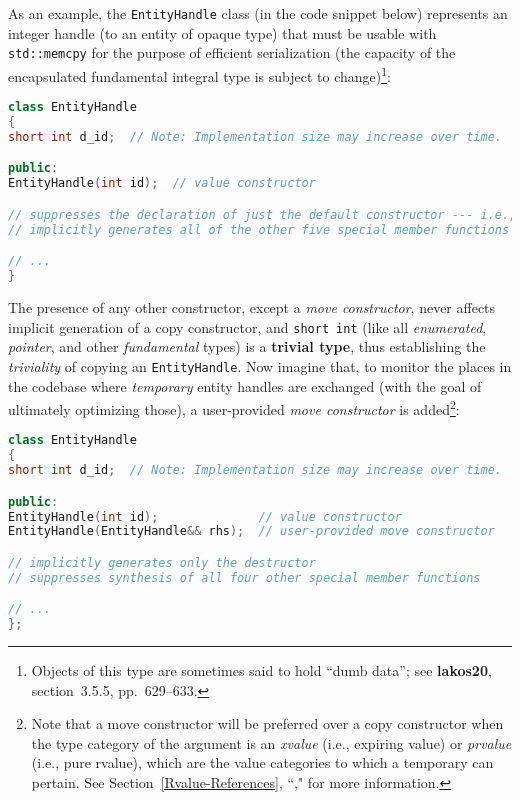 As an example, the \texttt{EntityHandle} class (in the code snippet below) represents an
integer handle (to an entity of opaque type) that must be usable with
\texttt{std::memcpy} for the purpose of efficient serialization (the
capacity of the encapsulated fundamental integral type is subject to
change){\cprotect\footnote{Objects of this type are sometimes said to
hold ``dumb data''; see \textbf{{lakos20}}, section~3.5.5,
pp.~629--633.}}:

\begin{lstlisting}[language=C++]
class EntityHandle
{
short int d_id;  // Note: Implementation size may increase over time.

public:
EntityHandle(int id);  // value constructor

// suppresses the declaration of just the default constructor --- i.e.,
// implicitly generates all of the other five special member functions

// ...
}
\end{lstlisting}

\noindent The presence of any other constructor, except a \emph{move constructor},
never affects implicit generation of a copy constructor, and
\texttt{short}~\texttt{int} (like all \emph{enumerated}, \emph{pointer},
and other \emph{fundamental} types) is a \textbf{trivial type}, thus
establishing the \emph{triviality} of copying an \texttt{EntityHandle}.
Now imagine that, to monitor the places in the codebase where
\emph{temporary} entity handles are exchanged (with the goal of
ultimately optimizing those), a user-provided \emph{move constructor} is
added{\cprotect\footnote{Note that a move constructor will be preferred
over a copy constructor when the type category of the argument is an
\emph{xvalue} (i.e., expiring value) or \emph{prvalue} (i.e., pure rvalue), which
are the value categories to which a temporary can pertain. See Section~\ref{Rvalue-References}, ``," for more information.}}:

\begin{lstlisting}[language=C++]
class EntityHandle
{
short int d_id;  // Note: Implementation size may increase over time.

public:
EntityHandle(int id);              // value constructor
EntityHandle(EntityHandle&& rhs);  // user-provided move constructor

// implicitly generates only the destructor
// suppresses synthesis of all four other special member functions

// ...
};
\end{lstlisting}

